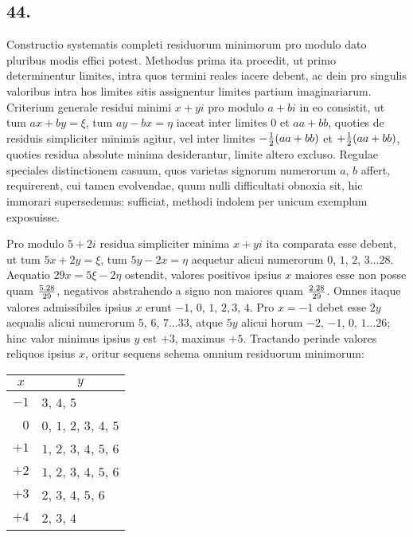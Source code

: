 \documentclass[twoside,12pt, showframe]{memoir}
\let\oldfrac\frac
\def\frac#1#2{\mathchoice{\tfrac{#1}{#2}}{\oldfrac{#1}{#2}}{\genfrac{}{}{}{2}{#1}{#2\mathstrut}}{\genfrac{}{}{}{3}{#1}{#2\mathstrut}}}
\begin{document}
\subsection*{44.}
 
Constructio systematis completi residuorum minimorum pro modulo dato pluribus modis effici potest. Methodus prima ita procedit, ut primo determinentur limites, intra quos termini reales iacere debent, ac dein pro singulis valoribus intra hos limites sitis assignentur limites partium imaginariarum. Criterium generale residui minimi \(x+y i\) pro modulo \(a+b i\) in eo consistit, ut tum \(a x+b y=\xi\), tum \(a y-b x=\eta\) iaceat inter limites \(0\) et \(a a+b b\), quoties de residuis simpliciter minimis agitur, vel inter limites \(-\frac{1}{2}(a a+b b)\) et \(+\frac{1}{2}(a a+b b)\), quoties residua absolute minima desiderantur, limite altero excluso. Regulae speciales distinctionem casuum, quos varietas signorum numerorum \(a\), \(b\) affert, requirerent, cui tamen evolvendae, quum nulli difficultati obnoxia sit, hic immorari supersedemus: sufficiat, methodi indolem per unicum exemplum exposuisse.

Pro modulo \(5+2 i\) residua simpliciter minima \(x+y i\) ita comparata esse debent, ut tum \(5 x+2 y=\xi\), tum \(5 y-2 x=\eta\) aequetur alicui numerorum \(0\), \(1\), \(2\), \(3 \ldots 28\). Aequatio \(29 x=5 \xi-2 \eta\) ostendit, valores positivos ipsius \(x\) maiores esse non posse quam \(\frac{5.28}{29}\), negativos abstrahendo a signo non maiores quam \(\frac{2.28}{29}\). Omnes itaque valores admissibiles ipsius \(x\) erunt \(-1\), \(0\), \(1\), \(2, 3\), \(4\). Pro \(x=-1\) debet esse \(2 y\) aequalis alicui numerorum \(5\), \(6\), \(7 \ldots 33\), atque \(5 y\) alicui horum \(-2\), \(-1\), \(0\), \(1 \ldots 26\); hinc valor minimus ipsius \(y\) est \(+3\), maximus \(+5\). Tractando perinde valores reliquos ipsius \(x\), oritur sequens sehema omnium residuorum minimorum:\clearpage\noindent%
\begin{center}
\begin{tabular}{r|l}
\multicolumn{1}{c|}{\(x\)} & \multicolumn{1}{c}{\(y\)} \\
\hline
\(-1\) & \(3\), \(4\), \(5\) \\
\(0\) & \(0\), \(1\), \(2\), \(3\), \(4\), \(5\) \\
\(+1\) & \(1\), \(2\), \(3\), \(4\), \(5\), \(6\) \\
\(+2\) & \(1\), \(2\), \(3\), \(4\), \(5\), \(6\) \\
\(+3\) & \(2\), \(3\), \(4\), \(5\), \(6\) \\
\(+4\) & \(2\), \(3\), \(4\) \\
\end{tabular}
\end{center}
\end{document}
